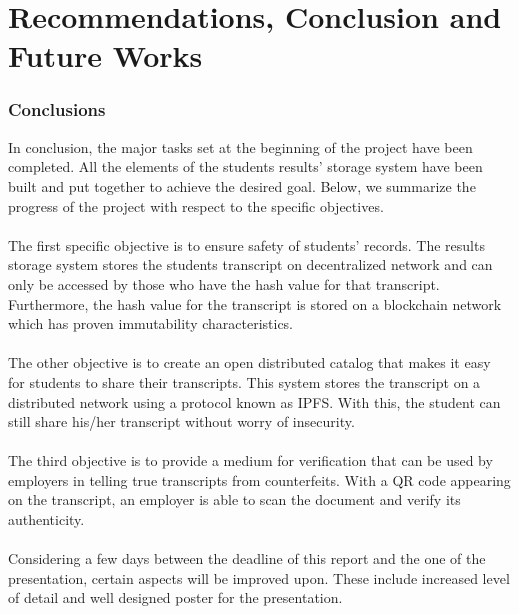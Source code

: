 \chapter{Recommendations, Conclusion and Future Works}

\subsection{Conclusions}
In conclusion, the major tasks set at the beginning of the project have been completed. All the elements of the students results' storage system have been built and put together to achieve the desired goal. Below, we summarize the progress of the project with respect to the specific objectives.\\~\\
The first specific objective is to ensure safety of students' records. The results storage system stores the students transcript on decentralized network and can only be accessed by those who have the hash value for that transcript. Furthermore, the hash value for the transcript is stored on a blockchain network which has proven immutability characteristics.\\~\\
The other objective is to create an open distributed catalog that makes it easy for students to share their transcripts. This system stores the transcript on a distributed network using a protocol known as IPFS. With this, the student can still share his/her transcript without worry of insecurity.\\~\\
The third objective is to provide a medium for verification that can be used by employers in telling true transcripts from counterfeits. With a QR code appearing on the transcript, an employer is able to scan the document and verify its authenticity.\\\\
Considering a few days between the deadline of this report and the one of the presentation, certain aspects will be improved upon. These include increased level of detail and well designed poster for the presentation.

